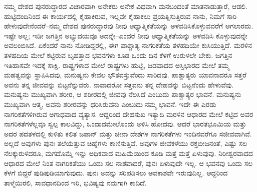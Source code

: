 ನಮ್ಮ ದೇಶದ ಪುನರುದ್ಧಾರದ ವಿಚಾರವಾಗಿ ಅನೇಕರು ಅನೇಕ ವಿಧವಾಗಿ ಮನಬಂದಂತೆ ಮಾತನಾಡುತ್ತಾರೆ, ಆಡಲಿ. ಹುಟ್ಟಿದಂದಿನಿಂದ ಈ ಕಾರ್ಯದಲ್ಲಿ ಕೈಹಾಕಿರುವ, ಇಲ್ಲವೇ ಕೈಹಾಕಲು ಪ್ರಯತ್ನಿಸುತ್ತಿರುವ ನಾನು, ನಿಮಗೆ ಸಾರಿ ಹೇಳುವುದೇನೆಂದರೆ–ನಮ್ಮ ದೇಶದ ಪುನರುದ್ಧಾರವು ನೀವು ಆಧ್ಯಾತ್ಮಿಕತೆಯನ್ನು ಅಳವಡಿಸಿಕೊಳ್ಳುವವರೆಗೆ ಆಗಲಾರದು. ಇಷ್ಟೇ ಅಲ್ಲ; ಇಡೀ ಜಗತ್ತಿನ ಅಭ್ಯುದಯವೂ ಅದನ್ನೇ–ಎಂದರೆ ನೀವು ಆಧ್ಯಾತ್ಮಿಕತೆಯನ್ನು ಅಳವಡಿಸಿ ಕೊಳ್ಳುವುದನ್ನೇ ಅವಲಂಬಿಸಿದೆ. ಏಕೆಂದರೆ ನಾನು ನೋಡಿದ್ದರಲ್ಲಿ, ಈಗ ಪಾಶ್ಚಾತ್ಯ ನಾಗರಿಕತೆಯ ತಳಹದಿಯೇ ಕುಸಿಯುತ್ತಿದೆ. ಮರಳಿನ ತಳಹದಿಯ ಮೇಲೆ ಕಟ್ಟಿರುವ ಬೃಹತ್ತಾದ ಭವನಗಳು ಕೂಡ ಒಂದು ದಿನ ಕೆಳಗೆ ಉರುಳಲೇ ಬೇಕು. ಜಗತ್ತಿನ ಇತಿಹಾಸವೇ ಇದಕ್ಕೆ ಸಾಕ್ಷಿ. ರಾಷ್ಟ್ರಗಳಾದ ಮೇಲೆ ರಾಷ್ಟ್ರಗಳು ಹುಟ್ಟಿ, ಜಡವಾದದ ಅಸ್ತಿಭಾರದ ಮೇಲೆ ತಮ್ಮ ಮಹತ್ವವನ್ನು ಸ್ಥಾಪಿಸಿದವು, ಮನುಷ್ಯನು ಕೇವಲ ಭೌತವಸ್ತುವೆಂದು ಸಾರಿದವು. ಪಾಶ್ಚಾತ್ಯರು ಯಾವನಾದರೂ ಸತ್ತರೆ ಅವನು ತನ್ನ ಜೀವವನ್ನು ಬಿಟ್ಟನೆನ್ನುವರು. ನಾವಾದರೋ ಸತ್ತವನು ತನ್ನ ದೇಹವನ್ನು ಬಿಟ್ಟನೆಂದು ಹೇಳುವೆವು. ಮನುಷ್ಯನು ಮುಖ್ಯವಾಗಿ ಶರೀರ, ಆ ಶರೀರದಲ್ಲಿ ಜೀವವು ನೆಲಸಿದೆ ಎಂಬುದು ಪಾಶ್ಚಾತ್ಯರ ಭಾವನೆ. ಮನುಷ್ಯನು ಮುಖ್ಯವಾಗಿ ಆತ್ಮ, ಅವನು ಶರೀರವನ್ನು ಧರಿಸಿರುವನು ಎಂಬುದು ನಮ್ಮ ಭಾವನೆ. ಇದೇ ಈ ಎರಡು ನಾಗರಿಕತೆಗಳಿಗಿರುವ ಅಗಾಧವಾದ ವ್ಯತ್ಯಾಸ. ಆದ್ದರಿಂದ ದೇಹಸುಖ ಇತ್ಯಾದಿ ಮರಳಿನ ಆಧಾರದ ಮೇಲೆ ಕಟ್ಟಿದ ಅವರ ನಾಗರಿಕತೆಗಳೆಲ್ಲವೂ ಸ್ವಲ್ಪ ಕಾಲವಿದ್ದು, ಒಂದಾದಮೇಲೊಂದು ಅಳಿಸಿ ಹೋದವು. ಆದರೆ ಭಾರತಭೂಮಿಯ ಮತ್ತು ಅದರ ಪದತಳದಲ್ಲಿ ಕುಳಿತು ಕಲಿತ ಜಪಾನ್​ ಮತ್ತು ಚೀನಾ ದೇಶಗಳ ನಾಗರಿಕತೆಗಳು ಇಂದಿನವರೆಗೂ ಸಜೀವವಾಗಿವೆ. ಅಲ್ಲದೆ ಅವುಗಳು ಪುನಃ ತಲೆಯೆತ್ತುವ ಚಿಹ್ನೆಗಳು ಕಾಣಿಸುತ್ತಿವೆ. ಅವುಗಳ ಜೀವಕಳೆಯು ರಕ್ತಬೀಜನಂತೆ, ಎಷ್ಟು ಸಲ ನೆಲಕ್ಕುರುಳಿದರೂ, ಮಗದೊಮ್ಮೆ ಇನ್ನು ಅಧಿಕವಾದ ಮಹಿಮೆಯಿಂದ ಕೂಡಿ ಮತ್ತೆ ಮತ್ತೆ ಏಳುವುವು. ನಿರೀಶ್ವರವಾದದ ಆಧಾರದ ಮೇಲೆ ನಿಂತ ನಾಗರಿಕತೆಯು ಒಂದು ಸಲ ನಾಶವಾದರೆ, ಪುನಃ ಏಳುವುದೇ ಇಲ್ಲ. ಆ ಭವನವು ಒಂದು ಸಲ ಕೆಳಗೆ ಬಿದ್ದರೆ ಪುಡಿಪುಡಿಯಾಗುವುದು. ಪುನಃ ಅದನ್ನು ಸರಿಪಡಿಸಲು ಅವಕಾಶವೇ ಇರುವುದಿಲ್ಲ. ಆದ್ದರಿಂದ ತಾಳ್ಮೆಯಿರಲಿ, ಸಾವಧಾನದಿಂದ ಇರಿ, ಭವಿಷ್ಯವು ನಮಗಾಗಿ ಕಾದಿದೆ. 

